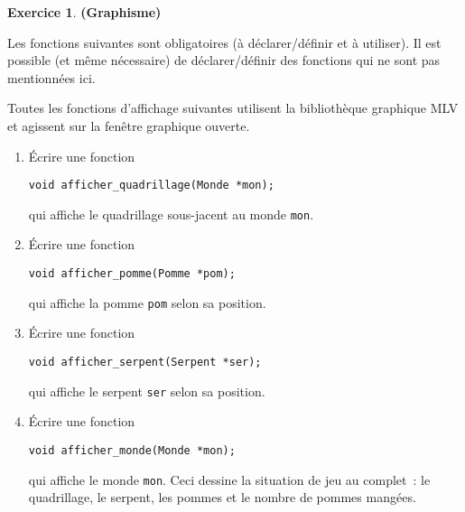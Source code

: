 \documentclass[11pt]{article}
\theoremstyle{definition}
\newtheorem{Exercice}{Exercice}
\begin{document}
\begin{Exercice} {\bf (Graphisme)}\smallskip

Les fonctions suivantes sont obligatoires (à déclarer/définir et à 
utiliser). Il est possible (et même nécessaire) de déclarer/définir des
fonctions qui ne sont pas mentionnées ici.
\smallskip

Toutes les fonctions d'affichage suivantes utilisent la bibliothèque
graphique {\sf MLV} et agissent sur la fenêtre graphique ouverte.
\smallskip

\begin{enumerate}
    \item Écrire une fonction
\begin{lstlisting}
void afficher_quadrillage(Monde *mon);
\end{lstlisting}
    qui affiche le quadrillage sous-jacent au monde {\tt mon}.
    \smallskip

    \item Écrire une fonction
\begin{lstlisting}
void afficher_pomme(Pomme *pom);
\end{lstlisting}
    qui affiche la pomme {\tt pom} selon sa position.
    \smallskip

    \item Écrire une fonction
\begin{lstlisting}
void afficher_serpent(Serpent *ser);
\end{lstlisting}
    qui affiche le serpent {\tt ser} selon sa position.
    \smallskip

    \item Écrire une fonction
\begin{lstlisting}
void afficher_monde(Monde *mon);
\end{lstlisting}
    qui affiche le monde {\tt mon}. Ceci dessine la situation de jeu
    au complet~: le quadrillage, le serpent, les pommes et le nombre
    de pommes mangées.
\end{enumerate}
\end{Exercice}
\bigskip
\end{document}
